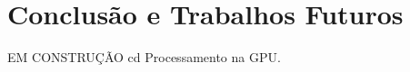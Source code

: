 \section{Conclusão e Trabalhos Futuros}
\label{sec:conclusao}

EM CONSTRUÇÃO
cd
Processamento na GPU.
